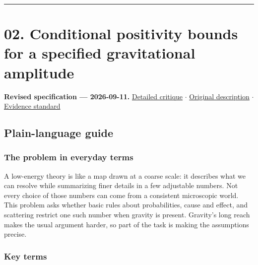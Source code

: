 \documentclass[
  11pt,
]{article}
\begin{document}
\begin{center}\rule{0.5\linewidth}{0.5pt}\end{center}

\section{02. Conditional positivity bounds for a specified gravitational
amplitude}

\textbf{Revised specification --- 2026-09-11.}
\href{https://github.com/rick-stevens-ai/Pure-Thought/blob/main/reviews/02-Gravitational-Positivity-Bounds.md}{Detailed
critique} \ensuremath{\cdot}
\href{https://github.com/rick-stevens-ai/Pure-Thought/blob/main/archive/original-PRDs/02-Gravitational-Positivity-Bounds.md}{Original
description} \ensuremath{\cdot}
\href{https://github.com/rick-stevens-ai/Pure-Thought/blob/main/reviews/EVIDENCE-STANDARD.md}{Evidence
standard}

\subsection{Plain-language guide}

\subsubsection{The problem in everyday terms}

A low-energy theory is like a map drawn at a coarse scale: it describes
what we can resolve while summarizing finer details in a few adjustable
numbers. Not every choice of those numbers can come from a consistent
microscopic world. This problem asks whether basic rules about
probabilities, cause and effect, and scattering restrict one such number
when gravity is present. Gravity's long reach makes the usual argument
harder, so part of the task is making the assumptions precise.

\subsubsection{Key terms}
\end{document}

